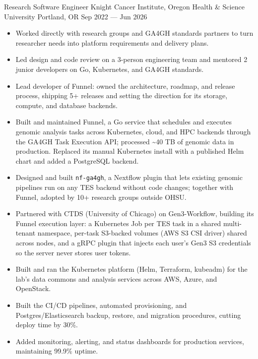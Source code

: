 \showoff
{Research Software Engineer}
{Knight Cancer Institute, Oregon Health \& Science University}
{Portland, OR}
{Sep 2022 --- Jun 2026}


\begin{itemize}
    \item Worked directly with research groups and GA4GH standards partners to turn researcher needs into platform requirements and delivery plans.
    \item Led design and code review on a 3-person engineering team and mentored 2 junior developers on Go, Kubernetes, and GA4GH standards.
    \item Lead developer of Funnel: owned the architecture, roadmap, and release process, shipping 5+ releases and setting the direction for its storage, compute, and database backends.
\end{itemize}


\begin{itemize}
    \item Built and maintained Funnel, a Go service that schedules and executes genomic analysis tasks across Kubernetes, cloud, and HPC backends through the GA4GH Task Execution API; processed \textasciitilde40 TB of genomic data in production. Replaced its manual Kubernetes install with a published Helm chart and added a PostgreSQL backend.
    \item Designed and built \texttt{nf-ga4gh}, a Nextflow plugin that lets existing genomic pipelines run on any TES backend without code changes; together with Funnel, adopted by 10+ research groups outside OHSU.
    \item Partnered with CTDS (University of Chicago) on Gen3-Workflow, building its Funnel execution layer: a Kubernetes Job per TES task in a shared multi-tenant namespace, per-task S3-backed volumes (AWS S3 CSI driver) shared across nodes, and a gRPC plugin that injects each user's Gen3 S3 credentials so the server never stores user tokens.
\end{itemize}


\begin{itemize}
    \item Built and ran the Kubernetes platform (Helm, Terraform, kubeadm) for the lab's data commons and analysis services across AWS, Azure, and OpenStack.
    \item Built the CI/CD pipelines, automated provisioning, and Postgres/Elasticsearch backup, restore, and migration procedures, cutting deploy time by 30\%.
    \item Added monitoring, alerting, and status dashboards for production services, maintaining 99.9\% uptime.
\end{itemize}

